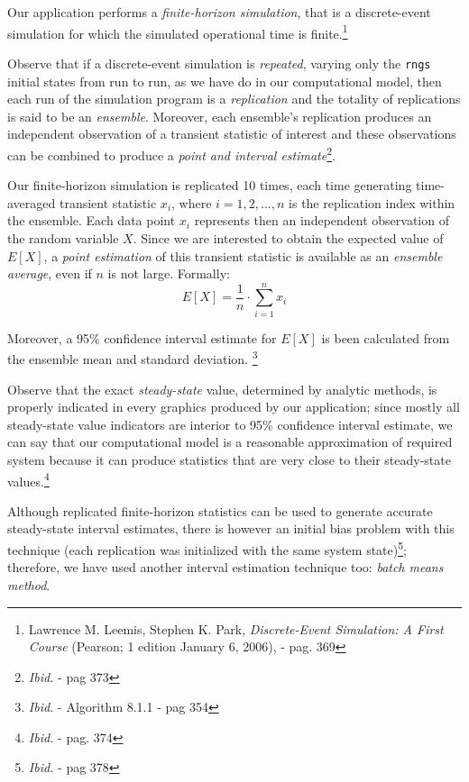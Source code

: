 \documentclass[10pt,a4paper]{article}
\begin{document}
Our application performs a \textit{finite-horizon simulation}, that is a discrete-event simulation for which the simulated operational time is finite.\footnote{Lawrence M. Leemis, Stephen K. Park, \textit{Discrete-Event Simulation: A First Course} (Pearson; 1 edition January 6, 2006), - pag. 369}

Observe that if a discrete-event simulation is \textit{repeated}, varying only the \texttt{rngs} initial states from run to run, as we have do in our computational model, then each run of the simulation program is a \textit{replication} and the totality of replications is said to be an \textit{ensemble}. Moreover, each ensemble's replication produces an independent observation of a transient statistic of interest and these observations can be combined to produce a \textit{point and interval estimate}\footnote{\textit{Ibid.} - pag 373}.

Our finite-horizon simulation is replicated 10 times, each time generating time-averaged transient statistic $x_i$, where $i = 1,2,...,n$ is the replication index within the ensemble. Each data point $x_i$ represents then an independent observation of the random variable $X$. Since we are interested to obtain the expected value of $E[X]$,  a \textit{point estimation} of this transient statistic is available as an \textit{ensemble average}, even if $n$ is not large. Formally:
\begin{equation}
E[X] = \dfrac{1}{n} \cdot \sum_{i=1}^{n} x_i
\end{equation}

Moreover, a 95\% confidence interval estimate for $E[X]$ is been calculated from the ensemble mean and standard deviation. \footnote{\textit{Ibid.} - Algorithm 8.1.1 - pag 354}

Observe that the exact \textit{steady-state} value, determined by analytic methods, is properly indicated in every graphics produced by our application; since mostly all steady-state value indicators are interior to 95\% confidence interval estimate, we can say that our computational model is a reasonable approximation of required system because it can produce statistics that are very close to their steady-state values.\footnote{\textit{Ibid.} - pag. 374}

Although replicated finite-horizon statistics can be used to generate accurate steady-state interval estimates,  there is however an initial bias problem with this technique (each replication was initialized with the same system state)\footnote{\textit{Ibid.} - pag 378}; therefore, we have used another interval estimation technique too: \textit{batch means method}.
\end{document}
